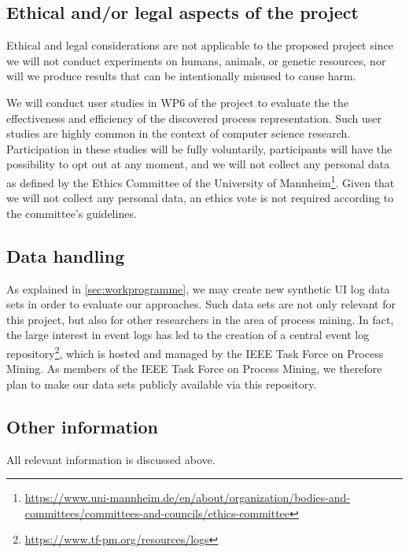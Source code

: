 
 \subsection{Ethical and/or legal aspects of the project}
 \label{sec:ethical}
 
Ethical and legal considerations are not applicable to the proposed project since we 
will not conduct experiments on humans, animals, or genetic resources, nor will we  produce results that can be intentionally misused to cause harm. 

We will conduct user studies in WP6 of the project to evaluate the the effectiveness and efficiency of the discovered process representation. Such user studies are highly common in the context of computer science research. Participation in these studies will be fully voluntarily, participants will have the possibility to opt out at any moment, and we will not collect any personal data as defined by the Ethics Committee of the University of Mannheim\footnote{\url{https://www.uni-mannheim.de/en/about/organization/bodies-and-committees/committees-and-councils/ethics-committee}}. Given that we will not collect any personal data, an ethics vote is not required according to the committee's guidelines. 

\subsection{Data handling}

As explained in \autoref{sec:workprogramme}, we may create new synthetic UI log data sets in order to evaluate our approaches. Such data sets are not only relevant for this project, but also for other researchers in the area of process mining. In fact, the large interest in event logs has led to the creation of a central event log repository\footnote{\url{https://www.tf-pm.org/resources/logs}}, which is hosted and managed by the IEEE Task Force on Process Mining. As members of the IEEE Task Force on Process Mining, we therefore plan to make our data sets publicly available via this repository.


\subsection{Other information}

All relevant information is discussed above. 